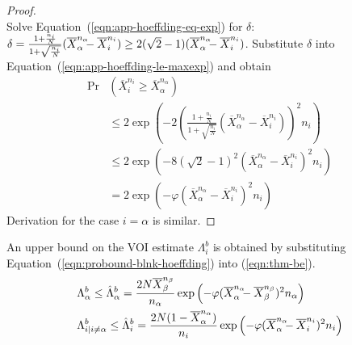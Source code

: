 \begin{proof}
\begin{equation}
	\end{equation}
	Solve Equation~(\ref{eqn:app-hoeffding-eq-exp}) for $\delta$: $\delta=\frac {1+\frac {n_i} N} {1+\sqrt {\frac {n_i} N}} (\overline X_\alpha^{n_\alpha}\hspace{-0.5em}
	- \overline X_i^{n_i}) \ge 2(\sqrt 2 - 1)(\overline X_\alpha^{n_\alpha}\hspace{-0.5em}-\overline X_i^{n_i})$. Substitute $\delta$ into 
	Equation~(\ref{eqn:app-hoeffding-le-maxexp}) and obtain
	\begin{align}
	\Pr&(\overline X_i^{n_i}\ge \overline X_\alpha^{n_\alpha}) \nonumber\\
	& \le 2\exp\left(-2\left( \frac {1+\frac {n_i} N} {1+\sqrt {\frac {n_i} N}}
	                          (\overline X_\alpha^{n_\alpha} - \overline X_i^{n_i})\right)^2 n_i\right)\nonumber \\
	& \le 2\exp(-8(\sqrt 2 - 1)^2(\overline X_\alpha^{n_\alpha} - \overline X_i^{n_i})^2n_i)\nonumber\\
	& = 2\exp(-\varphi(\overline X_\alpha^{n_\alpha} - \overline X_i^{n_i})^2n_i)
	\end{align}
	Derivation for the case $i=\alpha$ is similar.
\end{proof}	

\begin{crl}
An upper bound on the VOI estimate $\Lambda_i^b$ is obtained
by substituting Equation~(\ref{eqn:probound-blnk-hoeffding}) into (\ref{eqn:thm-be}).
\begin{align}
  \label{eqn:bound-blnk-hoeffding}
  \Lambda&_\alpha^b \le \hat\Lambda_\alpha^b=\frac {2N\overline X_\beta^{n_\beta}} {n_\alpha}\exp\left(- \varphi(\overline X_\alpha^{n_\alpha}\hspace{-0.5em} - \overline X_\beta^{n_\beta})^2 n_\alpha\right)\\
  \Lambda&_{i|i\ne\alpha}^b\le \hat\Lambda_i^b=  \frac {2N(1-\overline  X_\alpha^{n_\alpha})} {n_i}\exp\left(- \varphi(\overline X_\alpha^{n_\alpha}\hspace{-0.5em} - \overline X_i^{n_i})^2 n_i\right)\nonumber
\end{align}
\label{crl:bound-blnk-hoeffding}
\end{crl}
\vspace{-2em}

